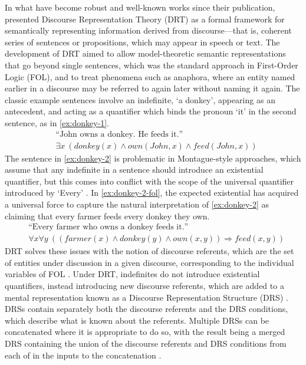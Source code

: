\documentclass[a4paper,12pt,leqno]{article}
\begin{document}
In what have become robust and well-known works since their publication, \citet{kamp1981theory,kamp1988discourse,Kamp1993} presented Discourse Representation Theory (DRT) as a formal framework for semantically representing information derived from discourse---that is, coherent series of sentences or propositions, which may appear in speech or text. The development of DRT aimed to allow model-theoretic semantic representations that go beyond single sentences, which was the standard approach in First-Order Logic (FOL), and to treat phenomena such as anaphora, where an entity named earlier in a discourse may be referred to again later without naming it again. The classic example sentences \citep{kamp1988discourse} involve an indefinite, `a donkey', appearing as an antecedent, and acting as a quantifier which binds the pronoun `it' in the second sentence, as in \cref{ex:donkey-1}.
\begin{subequations}
	\begin{align}
		&\text{``John owns a donkey. He feeds it.''}\label{ex:donkey-1}\\
		&\exists x ~(donkey(x) \land own(John, x) \land feed(John, x))\label{ex:donkey-1-fol}
	\end{align}
\end{subequations}
The sentence in \cref{ex:donkey-2} is problematic in Montague-style approaches, which assume that any indefinite in a sentence should introduce an existential quantifier, but this comes into conflict with the scope of the universal quantifier introduced by `Every' \citep[p, 91]{kamp1988discourse}. In \cref{ex:donkey-2-fol}, the expected existential has acquired a universal force to capture the natural interpretation of \cref{ex:donkey-2} as claiming that every farmer feeds every donkey they own.
\begin{subequations}
	\begin{align}
		&\text{``Every farmer who owns a donkey feeds it.''}\label{ex:donkey-2}\\
		&\forall x \forall y ~((farmer(x) \land donkey(y) \land own(x,y)) \Longrightarrow feed(x,y))\label{ex:donkey-2-fol}
	\end{align}
\end{subequations}
DRT solves these issues with the notion of discourse referents, which are the set of entities under discussion in a given discourse, corresponding to the individual variables of FOL \citep[p. 397]{Bird2009}. Under DRT, indefinites do not introduce existential quantifiers, instead introducing new discourse referents, which are added to a mental representation known as a Discourse Representation Structure (DRS) \citep{geurts2007discourse}. DRSs contain separately both the discourse referents and the DRS conditions, which describe what is known about the referents. Multiple DRSs can be concatenated where it is appropriate to do so, with the result being a merged DRS containing the union of the discourse referents and DRS conditions from each of in the inputs to the concatenation \citep[p. 399]{Bird2009}.
\end{document}
